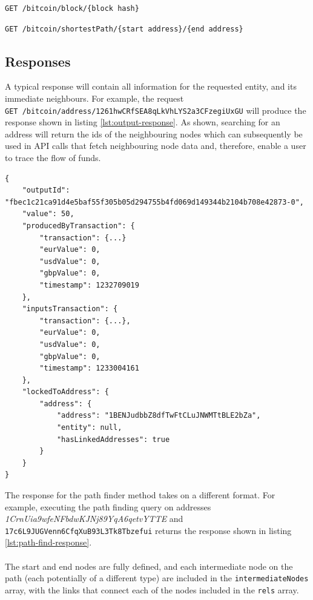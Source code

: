 \begin{lstlisting}[caption={Get a block with a unique block hash}, breaklines=true, basicstyle=\small]
GET /bitcoin/block/{block hash}
\end{lstlisting}

\begin{lstlisting}[caption={Find a path between two addresses using their full address strings}, breaklines=true, basicstyle=\small]
GET /bitcoin/shortestPath/{start address}/{end address}
\end{lstlisting}

\subsection{Responses}
A typical response will contain all information for the requested entity, and its immediate neighbours. For example, the request \\\texttt{GET /bitcoin/address/1261hwCRfSEA8qLkVhLYS2a3CFzegiUxGU} will produce the response shown in listing \ref{lst:output-response}.
As shown, searching for an address will return the ids of the neighbouring nodes which can subsequently be used in API calls that fetch neighbouring node data and, therefore, enable a user to trace the flow of funds. 

\begin{lstlisting}[label={lst:output-response}, caption={GET Output Example Response}, breaklines=true, basicstyle=\small]
{
    "outputId": "fbec1c21ca91d4e5baf55f305b05d294755b4fd069d149344b2104b708e42873-0",
    "value": 50,
    "producedByTransaction": {
        "transaction": {...}
        "eurValue": 0,
        "usdValue": 0,
        "gbpValue": 0,
        "timestamp": 1232709019
    },
    "inputsTransaction": {
        "transaction": {...},
        "eurValue": 0,
        "usdValue": 0,
        "gbpValue": 0,
        "timestamp": 1233004161
    },
    "lockedToAddress": {
        "address": {
            "address": "1BENJudbbZ8dfTwFtCLuJNWMTtBLE2bZa",
            "entity": null,
            "hasLinkedAddresses": true
        }
    }
}
\end{lstlisting}

The response for the path finder method takes on a different format. For example, executing the path finding query on addresses \textit{1CrnUia9wfeNFbdwKJNj89YqA6qetvYTTE} and \texttt{17c6L9JUGVenn6CfqXuB93L3Tk8Tbzefui} returns the response shown in listing \ref{lst:path-find-response}.
\\\\
The start and end nodes are fully defined, and each intermediate node on the path (each potentially of a different type) are included in the \texttt{intermediateNodes} array, with the links that connect each of the nodes included in the \texttt{rels} array. 

